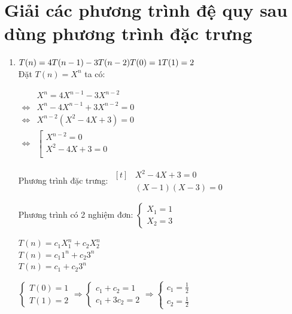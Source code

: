 \documentclass[12pt, letterpaper]{article}
\begin{document}
\section{Giải các phương trình đệ quy sau dùng phương trình đặc trưng}
\begin{enumerate}
    \item $ T(n) = 4T(n - 1) - 3T(n-2) \\
            T(0) = 1 \\
            T(1) = 2 $ \\
        Đặt $ T(n) = X^n $ ta có:

        $ \begin{aligned}
            & X^n = 4X^{n - 1} - 3X^{n - 2} \\
            \Leftrightarrow & X^n - 4X^{n - 1} + 3X^{n - 2} = 0 \\
            \Leftrightarrow & X^{n - 2}(X^2 - 4X + 3) = 0 \\
            \Leftrightarrow & \left[
            \begin{array}{ll}
                X^{n - 2} = 0 \\
                X^2 - 4X + 3 = 0 \\
            \end{array}
            \right .
        \end{aligned} $

        Phương trình đặc trưng: $ \begin{aligned}[t]
            & X^2 - 4X + 3 = 0 \\
            & (X - 1)(X - 3) = 0
        \end{aligned} $

        Phương trình có 2 nghiệm đơn: $ \begin{cases}
            X_1 = 1 \\
            X_2 = 3
        \end{cases} $

        $ T(n) = c_1X_1^n + c_2X_2^n $ \\
        $ T(n) = c_1 1^n + c_2 3^n $ \\
        $ T(n) = c_1 + c_2 3^n $

        $ \begin{cases}
            T(0) = 1 \\
            T(1) = 2
        \end{cases}
        \Rightarrow{}
        \begin{cases}
            c_1 + c_2 = 1 \\
            c_1 + 3c_2 = 2
        \end{cases}
        \Rightarrow{}
        \begin{cases}
            c_1 = \frac{1}{2} \\
            c_2 = \frac{1}{2}
        \end{cases} $


\end{enumerate}
\end{document}
